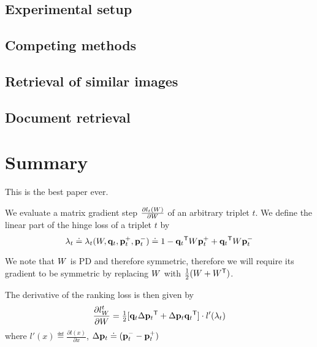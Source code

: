 \documentclass{article}
\begin{document}
\subsection{Experimental setup}
\subsection{Competing methods}
\subsection{Retrieval of similar images}
\subsection{Document retrieval}


\section{Summary}
This is the best paper ever.














We evaluate a matrix gradient step $\frac{\partial {l_t
({W})}}{\partial {W}}$ of an arbitrary triplet $t$. We define the linear
part of the hinge loss of a triplet $t$ by
\begin{equation}
  \lambda_t \doteq \lambda_t({W}, {\mathbf{q}}_t, {\mathbf{p}}_{t}^{+}, {\mathbf{p}}_{t}^{-}) \doteq 1-{\mathbf{q}}_{t}{}^\mathsf{T} {W} {\mathbf{p}}_{t}^{+}+{\mathbf{q}}_{t}{}^\mathsf{T}{W}{\mathbf{p}}_{t}^{-}
\end{equation}

We note that ${W}$ is PD and therefore symmetric, therefore we will
require its gradient to be symmetric by replacing ${W}$ with
$\tfrac{1}{2}({W} + {W}{}^\mathsf{T})$.

The derivative of the ranking loss is then given by
\begin{equation}
  \frac{\partial {l_{{W}}^{t}}}{\partial {W}} =
  \tfrac{1}{2}[{\mathbf{q}}_{t}\Delta{\mathbf{p}}_{t}{}^\mathsf{T} + \Delta{\mathbf{p}}_{t}{\mathbf{q}}_{t}{}^\mathsf{T}]\cdot
  {l'}(\lambda_t)
  \label{dlossranking}
\end{equation} 
where $l'(x) \eqdef \frac{\partial {l(x)}}{\partial x}$, $\Delta{\mathbf{p}}_{t}
\doteq ({\mathbf{p}}_{t}^{-} - {\mathbf{p}}_{t}^{+})$
\end{document}
